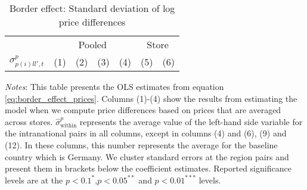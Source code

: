 \begin{table}[H]
    \centering
    \caption{Border effect: Standard deviation of log price differences}
    \label{tab: border_effects_sd}
    \begin{spacing}{1.1}
        \begin{tabular}{lcccccc} \toprule
            & \multicolumn{4}{c}{Pooled} & \multicolumn{2}{c}{Store} \\ 
            \cmidrule(lr){2-5} \cmidrule(lr){6-7}
            $\sigma^{p}_{p(i)ll',t}$ & (1) & (2) & (3) & (4) & (5) & (6) \\ \midrule
            
        \end{tabular}
    \end{spacing}
    \parbox{\textwidth}{
    \begin{spacing}{1} 
        {\footnotesize 
        \textit{Notes}: This table presents the OLS estimates from equation \ref{eq:border_effect_prices}. Columns (1)-(4) show the results from estimating the model when we compute price differences based on prices that are averaged across stores. $\hat{\sigma}^p_{\text{within}}$ represents the average value of the left-hand side variable for the intranational pairs in all columns, except in columns (4) and (6), (9) and (12). In these columns, this number represents the average for the baseline country which is Germany. We cluster standard errors at the region pairs and present them in brackets below the coefficient estimates. Reported significance levels are at the $p<0.1^{*}$,$p<0.05^{**}$ and $p<0.01^{***}$ levels.} 
    \end{spacing}}
 \end{table}

